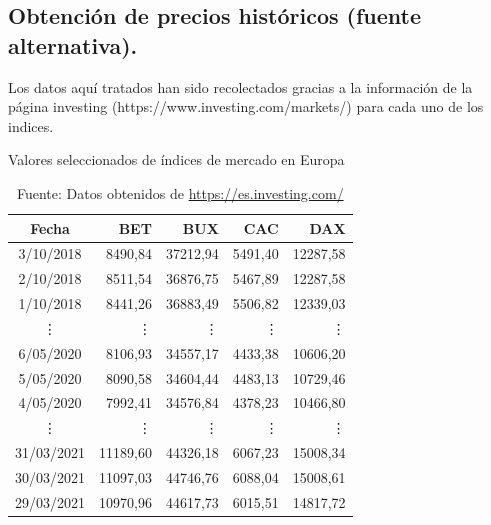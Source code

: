 \documentclass[12pt]{article}
\begin{document}
  \subsection {Obtención de precios históricos (fuente alternativa).}
Los datos aquí tratados han sido recolectados gracias a la información de la página investing (https://www.investing.com/markets/) para cada uno de los indices.
\begin{table}[H]
\centering
\caption{Valores seleccionados de índices de mercado en Europa}
\begin{tabular}{|c|r|r|r|r|}
\hline
\textbf{Fecha} & \textbf{BET} & \textbf{BUX} & \textbf{CAC} & \textbf{DAX} \\
\hline
3/10/2018  & 8490,84  & 37212,94 & 5491,40 & 12287,58\\
2/10/2018  & 8511,54  & 36876,75 & 5467,89 & 12287,58 \\
1/10/2018  & 8441,26  & 36883,49 & 5506,82 & 12339,03 \\
\vdots     & \vdots   & \vdots   & \vdots   & \vdots \\
6/05/2020  & 8106,93  & 34557,17 & 4433,38 & 10606,20 \\
5/05/2020  & 8090,58  & 34604,44 & 4483,13 & 10729,46 \\
4/05/2020  & 7992,41  & 34576,84 & 4378,23 & 10466,80 \\
\vdots     & \vdots   & \vdots   & \vdots   & \vdots \\
31/03/2021 & 11189,60 & 44326,18 & 6067,23 & 15008,34 \\
30/03/2021 & 11097,03 & 44746,76 & 6088,04 & 15008,61 \\
29/03/2021 & 10970,96 & 44617,73 & 6015,51 & 14817,72 \\
\hline
\end{tabular}
\captionsetup{justification=centering}
\caption*{\footnotesize Fuente: Datos obtenidos de \url{https://es.investing.com/}}
\end{table}
\end{document}
